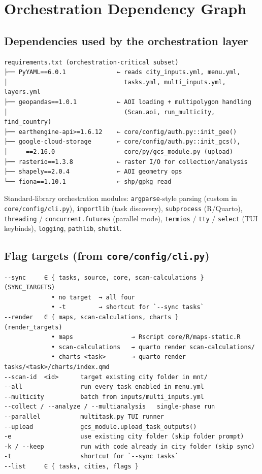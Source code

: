 \documentclass[
  letterpaper,
  DIV=11,
  numbers=noendperiod]{scrreprt}
\begin{document}
\chapter{Orchestration Dependency
Graph}\label{orchestration-dependency-graph}

\section{Dependencies used by the orchestration
layer}\label{dependencies-used-by-the-orchestration-layer}

\begin{verbatim}
requirements.txt (orchestration-critical subset)
├── PyYAML==6.0.1              ← reads city_inputs.yml, menu.yml,
│                                tasks.yml, multi_inputs.yml, layers.yml
├── geopandas==1.0.1           ← AOI loading + multipolygon handling
│                                (Scan.aoi, run_multicity, find_country)
├── earthengine-api>=1.6.12    ← core/config/auth.py::init_gee()
├── google-cloud-storage       ← core/config/auth.py::init_gcs(),
│     ==2.16.0                   core/py/gcs_module.py (upload)
├── rasterio==1.3.8            ← raster I/O for collection/analysis
├── shapely==2.0.4             ← AOI geometry ops
└── fiona==1.10.1              ← shp/gpkg read
\end{verbatim}

Standard-library orchestration modules: \texttt{argparse}-style parsing
(custom in \texttt{core/config/cli.py}), \texttt{importlib} (task
discovery), \texttt{subprocess} (R/Quarto), \texttt{threading} /
\texttt{concurrent.futures} (parallel mode), \texttt{termios} /
\texttt{tty} / \texttt{select} (TUI keybinds), \texttt{logging},
\texttt{pathlib}, \texttt{shutil}.

\section{\texorpdfstring{Flag targets (from
\texttt{core/config/cli.py})}{Flag targets (from core/config/cli.py)}}\label{flag-targets-from-coreconfigcli.py}

\begin{verbatim}
--sync     ∈ { tasks, source, core, scan-calculations }   (SYNC_TARGETS)
             • no target  → all four
             • -t         → shortcut for `--sync tasks`
--render   ∈ { maps, scan-calculations, charts }          (render_targets)
             • maps                → Rscript core/R/maps-static.R
             • scan-calculations   → quarto render scan-calculations/
             • charts <task>       → quarto render tasks/<task>/charts/index.qmd
--scan-id  <id>      target existing city folder in mnt/
--all                run every task enabled in menu.yml
--multicity          batch from inputs/multi_inputs.yml
--collect / --analyze / --multianalysis   single-phase run
--parallel           multitask.py TUI runner
--upload             gcs_module.upload_task_outputs()
-e                   use existing city folder (skip folder prompt)
-k / --keep          run with code already in city folder (skip sync)
-t                   shortcut for `--sync tasks`
--list     ∈ { tasks, cities, flags }
\end{verbatim}
\end{document}
